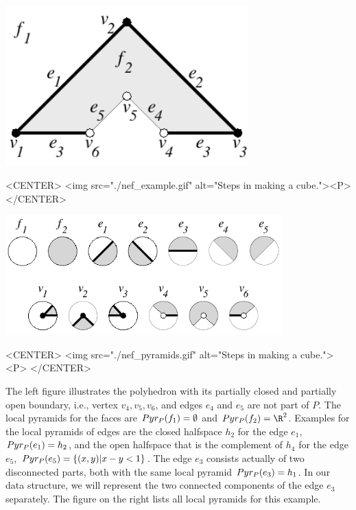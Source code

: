 \begin{minipage}[t]{0.5\textwidth}
\begin{ccTexOnly}
    \begin{center}
      \parbox{0.7\textwidth}{%
          \includegraphics[width=0.70\textwidth]{Nef_3/fig/nef_example}%
      }
    \end{center}
\end{ccTexOnly}

\begin{ccHtmlOnly}
    <CENTER>
        <img src="./nef_example.gif" alt="Steps in making a cube."><P>
    </CENTER>
\end{ccHtmlOnly}
\end{minipage}
\begin{minipage}[t]{0.5\textwidth}
\begin{ccTexOnly}
    \begin{center}
      \parbox{0.8\textwidth}{%
          \includegraphics[width=0.80\textwidth]{Nef_3/fig/nef_pyramids}%
      }
    \end{center}
\end{ccTexOnly}

\begin{ccHtmlOnly}
    <CENTER>
        <img src="./nef_pyramids.gif" alt="Steps in making a cube."><P>
    </CENTER>
\end{ccHtmlOnly}
\end{minipage}

The left figure illustrates the polyhedron with
its partially closed and partially open boundary, i.e., vertex 
$v_4, v_5, v_6$, and edges $e_4$ and $e_5$ are not part of $P$.
The local pyramids for the faces are $Pyr_P(f_1) = \emptyset$
and $\pyr_P(f_2) = \R^2$. Examples for the local pyramids of edges
are the closed halfspace $h_2$ for the edge $e_1$, $Pyr_P(e_1) = h_2$,
and the open halfspace that is the complement of $h_4$ for the 
edge $e_5$, $Pyr_P(e_5) =
\{(x,y) | x - y < 1\}$. The edge $e_3$ consists actually of two
disconnected parts, both with the same local pyramid $Pyr_P(e_3) = h_1$.
In our data structure, we will represent the two connected
components of the edge $e_3$ separately.
The figure on the right  
lists all local pyramids for this example.


